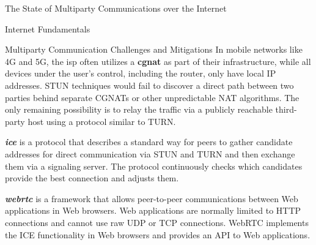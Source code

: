 \begin{frame}[fragile]{The State of Multiparty Communications over the
Internet}
\begin{block}{Internet Fundamentals}
\begin{block}{Multiparty Communication Challenges and Mitigations}
In mobile networks like 4G and 5G, the \gls{isp} often utilizes a
\textbf{\gls{cgnat}} as part of their infrastructure, while all devices
under the user's control, including the router, only have local IP
addresses. STUN techniques would fail to discover a direct path between
two parties behind separate CGNATs or other unpredictable NAT
algorithms. The only remaining possibility is to relay the traffic via a
publicly reachable third-party host using a protocol similar to TURN.


\textbf{\emph{\gls{ice}}} is a protocol that describes a standard way
for peers to gather candidate addresses for direct communication via
STUN and TURN and then exchange them via a signaling server. The
protocol continuously checks which candidates provide the best
connection and adjusts them.

\textbf{\emph{\gls{webrtc}}} is a framework that allows peer-to-peer
communications between Web applications in Web browsers. Web
applications are normally limited to HTTP connections and cannot use raw
UDP or TCP connections. WebRTC implements the ICE functionality in Web
browsers and provides an API to Web applications.

\end{block}
\end{block}


\end{frame}
